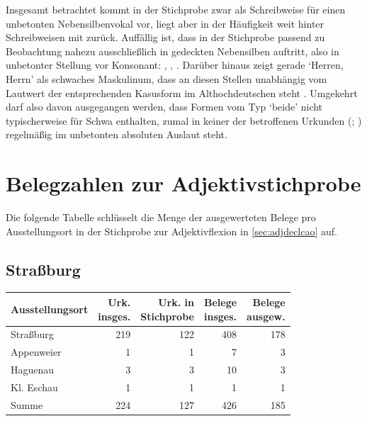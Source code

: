 Insgesamt betrachtet kommt  in der Stichprobe zwar als Schreibweise für
einen unbetonten Nebensilbenvokal vor, liegt aber in der Häufigkeit weit hinter
Schreibweisen mit  zurück. Auffällig ist, dass  in der Stichprobe
passend zu  Beobachtung nahezu
ausschließlich in gedeckten Nebensilben auftritt, also in unbetonter Stellung
vor Konsonant: , , .
Darüber hinaus zeigt gerade  `Herren, Herrn' als schwaches
Maskulinum, dass  an diesen Stellen unabhängig vom Lautwert der
entsprechenden Kasusform im Althochdeutschen steht
\autocite[vgl.][282--283]{braune2018}. Umgekehrt darf also davon ausgegangen
werden, dass Formen vom Typ  `beide' nicht typischerweise
 für Schwa enthalten, zumal in keiner der betroffenen Urkunden
(\cites(Nrn.~81, 190)[124,18--33; 205,30--45]{cao1};
\cites(Nr.~N~230)[175,1--33]{cao5}) regelmäßig  im unbetonten absoluten
Auslaut steht.


\chapter{Belegzahlen zur Adjektivstichprobe}
\label{sec:caoadjquanttab}

Die folgende Tabelle schlüsselt die Menge der ausgewerteten Belege pro
Ausstellungsort in der Stichprobe zur Adjektivflexion in \cref{sec:adjdeclcao}
auf.

\section{Straßburg}

\begin{tabularx}{\linewidth}{X r r r r}
\toprule
Ausstellungsort
	& \makecell{Urk.\\ insges.}
	& \makecell{Urk. in\\ Stichprobe}
	& \makecell{Belege\\ insges.}
	& \makecell{Belege\\ ausgew.}
	\\
\midrule

Straßburg
	& 219
	& 122
	& 408
	& 178
	\\

Appenweier
	& 1
	& 1
	& 7
	& 3
	\\

Haguenau
	& 3
	& 3
	& 10
	& 3
	\\

Kl. Eschau
	& 1
	& 1
	& 1
	& 1
	\\

\midrule

Summe
	& 224
	& 127
	& 426
	& 185
	\\

\bottomrule
\end{tabularx}

